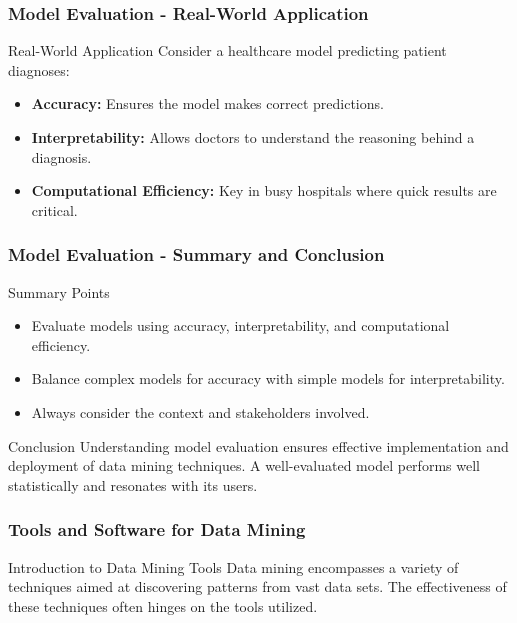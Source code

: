 \documentclass[aspectratio=169]{beamer}
\begin{document}
\begin{frame}[fragile]
    \frametitle{Model Evaluation - Real-World Application}
    \begin{block}{Real-World Application}
        Consider a healthcare model predicting patient diagnoses:
        \begin{itemize}
            \item \textbf{Accuracy:} Ensures the model makes correct predictions.
            \item \textbf{Interpretability:} Allows doctors to understand the reasoning behind a diagnosis.
            \item \textbf{Computational Efficiency:} Key in busy hospitals where quick results are critical.
        \end{itemize}
    \end{block}
\end{frame}

\begin{frame}[fragile]
    \frametitle{Model Evaluation - Summary and Conclusion}
    \begin{block}{Summary Points}
        \begin{itemize}
            \item Evaluate models using accuracy, interpretability, and computational efficiency.
            \item Balance complex models for accuracy with simple models for interpretability.
            \item Always consider the context and stakeholders involved.
        \end{itemize}
    \end{block}
    
    \begin{block}{Conclusion}
        Understanding model evaluation ensures effective implementation and deployment of data mining techniques. 
        A well-evaluated model performs well statistically and resonates with its users.
    \end{block}
\end{frame}

\begin{frame}
    \frametitle{Tools and Software for Data Mining}
    \begin{block}{Introduction to Data Mining Tools}
        Data mining encompasses a variety of techniques aimed at discovering patterns from vast data sets. The effectiveness of these techniques often hinges on the tools utilized.
    \end{block}
\end{frame}
\end{document}
